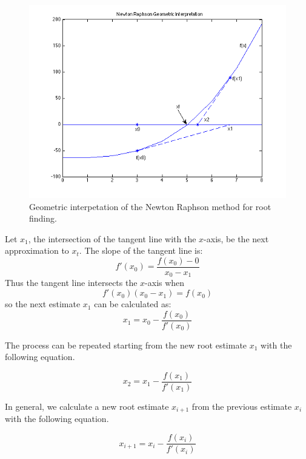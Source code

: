 \documentclass [titlepage,12pt,letter] {article}
\begin{document}
\begin{figure}[ht]
  \centering
  \includegraphics[scale=0.75]{newton}
  \caption{Geometric interpetation of the Newton Raphson method for
    root finding.}
  \label{fig:newton}
\end{figure}

\noindent 
Let $x_1$, the intersection of the tangent line with the $x$-axis, be
the next approximation to $x_t$. The slope of the tangent line is: 
\begin{equation}
f'(x_0)=\frac{f(x_0)-0}{x_0-x_1} 
\end{equation} 
\noindent Thus the tangent line intersects the $x$-axis when
\begin{equation} 
f'(x_0)(x_0-x_1) = f(x_0)
\end{equation} 
\noindent 
so the next estimate $x_1$ can be calculated as: 
\begin{equation} 
x_{1} = x_{0} - \frac{f(x_0)}{f'(x_0)}
\end{equation}

The process can be repeated starting from the new root estimate $x_1$
with the following equation. 

\begin{equation} 
x_2 = x_1 - \frac{f(x_1)}{f'(x_1)}
\end{equation}

In general, we calculate a new root estimate $x_{i+1}$ from the previous estimate
$x_i$ with the following equation. 

\begin{equation} 
x_{i+1} = x_i - \frac{f(x_i)}{f'(x_i)}
\end{equation} 
\end{document}
